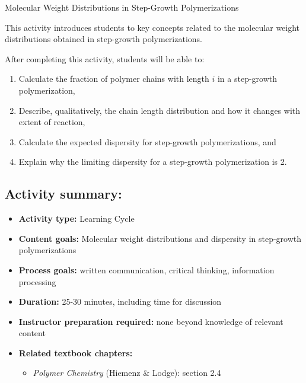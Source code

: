 %
%
%
%

\renewcommand{\figpath}{content/polymchem/stepgrowth/dispersity/figs}
\renewcommand{\labelbase}{step-dispersity}

\begin{activity}{Molecular Weight Distributions in Step-Growth Polymerizations}

\begin{instructornotes}

	This activity introduces students to key concepts related to the molecular weight distributions obtained in step-growth polymerizations.
	
	After completing this activity, students will be able to:
			\begin{enumerate}
				\item Calculate the fraction of polymer chains with length $i$ in a step-growth polymerization,
				\item Describe, qualitatively, the chain length distribution and how it changes with extent of reaction,
				\item Calculate the expected dispersity for step-growth polymerizations, and
				\item Explain why the limiting dispersity for a step-growth polymerization is 2.
			\end{enumerate}
			
	\subsection*{Activity summary:}
	\begin{itemize}
		\item \textbf{Activity type:} Learning Cycle
		\item \textbf{Content goals:} Molecular weight distributions and dispersity in step-growth polymerizations
		\item \textbf{Process goals:} %
			written communication, critical thinking, information processing
		\item \textbf{Duration:} 25-30 minutes, including time for discussion
		\item \textbf{Instructor preparation required:} none beyond knowledge of relevant content
		\item \textbf{Related textbook chapters:}
			\begin{itemize}
				\item \emph{Polymer Chemistry} (Hiemenz \& Lodge): section 2.4
			\end{itemize}
	\end{itemize}


\end{instructornotes}
\end{activity}
